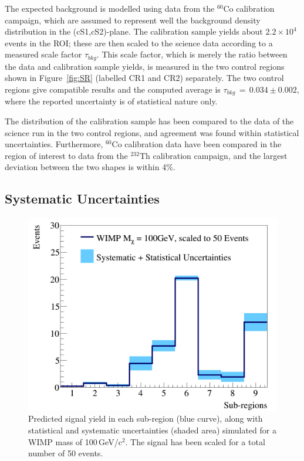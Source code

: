 The expected background is modelled using data from the $^{60}$Co calibration campaign, which are assumed to represent well the background density distribution 
in the (cS1,cS2)-plane. The calibration sample yields  about $2.2\times10^4$ events in the ROI; these are then scaled to the science data according to a measured scale 
factor $\tau_{bkg}$. This scale factor, which is merely the ratio between the data and calibration sample yields, is measured in the two control regions shown in Figure~\ref{fig:SR} (labelled CR1 and CR2) separately. The two control regions give compatible results and the computed average is $\tau_{bkg} \, =  \, 0.034 \pm 0.002 $, where the reported uncertainty 
is of statistical nature only.

The distribution of the calibration sample has been compared to the data of the science run in the two control regions,
and agreement was found within statistical uncertainties. Furthermore, $^{60}$Co calibration data have been compared in the region of interest to  
data from the $^{232}$Th calibration campaign, and the largest deviation between the two shapes is within 4\%. 




\subsection{Systematic Uncertainties}

\begin{figure}[t!]
  \includegraphics[width=\linewidth]{images/wimp_sys_unc.png}
\caption{Predicted signal yield in each sub-region (blue curve), along with statistical and systematic uncertainties (shaded area) simulated for a WIMP mass of 100\,GeV/c$^2$.  The signal has been scaled for a total number of 50 events.}
  \label{fig:unc}
\end{figure}



